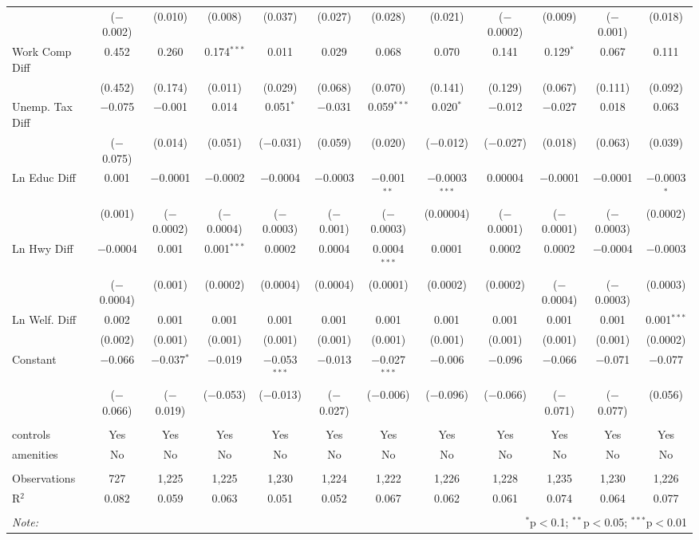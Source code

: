 \begin{table}[!htbp]
\begin{tabular}{@{\extracolsep{5pt}}lccccccccccc}
  & ($-$0.002) & (0.010) & (0.008) & (0.037) & (0.027) & (0.028) & (0.021) & ($-$0.0002) & (0.009) & ($-$0.001) & (0.018) \\ 
  Work Comp Diff & 0.452 & 0.260 & 0.174$^{***}$ & 0.011 & 0.029 & 0.068 & 0.070 & 0.141 & 0.129$^{*}$ & 0.067 & 0.111 \\ 
  & (0.452) & (0.174) & (0.011) & (0.029) & (0.068) & (0.070) & (0.141) & (0.129) & (0.067) & (0.111) & (0.092) \\ 
  Unemp. Tax Diff & $-$0.075 & $-$0.001 & 0.014 & 0.051$^{*}$ & $-$0.031 & 0.059$^{***}$ & 0.020$^{*}$ & $-$0.012 & $-$0.027 & 0.018 & 0.063 \\ 
  & ($-$0.075) & (0.014) & (0.051) & ($-$0.031) & (0.059) & (0.020) & ($-$0.012) & ($-$0.027) & (0.018) & (0.063) & (0.039) \\ 
  Ln Educ Diff & 0.001 & $-$0.0001 & $-$0.0002 & $-$0.0004 & $-$0.0003 & $-$0.001$^{**}$ & $-$0.0003$^{***}$ & 0.00004 & $-$0.0001 & $-$0.0001 & $-$0.0003$^{*}$ \\ 
  & (0.001) & ($-$0.0002) & ($-$0.0004) & ($-$0.0003) & ($-$0.001) & ($-$0.0003) & (0.00004) & ($-$0.0001) & ($-$0.0001) & ($-$0.0003) & (0.0002) \\ 
  Ln Hwy Diff & $-$0.0004 & 0.001 & 0.001$^{***}$ & 0.0002 & 0.0004 & 0.0004$^{***}$ & 0.0001 & 0.0002 & 0.0002 & $-$0.0004 & $-$0.0003 \\ 
  & ($-$0.0004) & (0.001) & (0.0002) & (0.0004) & (0.0004) & (0.0001) & (0.0002) & (0.0002) & ($-$0.0004) & ($-$0.0003) & (0.0003) \\ 
  Ln Welf. Diff & 0.002 & 0.001 & 0.001 & 0.001 & 0.001 & 0.001 & 0.001 & 0.001 & 0.001 & 0.001 & 0.001$^{***}$ \\ 
  & (0.002) & (0.001) & (0.001) & (0.001) & (0.001) & (0.001) & (0.001) & (0.001) & (0.001) & (0.001) & (0.0002) \\ 
  Constant & $-$0.066 & $-$0.037$^{*}$ & $-$0.019 & $-$0.053$^{***}$ & $-$0.013 & $-$0.027$^{***}$ & $-$0.006 & $-$0.096 & $-$0.066 & $-$0.071 & $-$0.077 \\ 
  & ($-$0.066) & ($-$0.019) & ($-$0.053) & ($-$0.013) & ($-$0.027) & ($-$0.006) & ($-$0.096) & ($-$0.066) & ($-$0.071) & ($-$0.077) & (0.056) \\ 
 \hline \\[-1.8ex] 
controls & Yes & Yes & Yes & Yes & Yes & Yes & Yes & Yes & Yes & Yes & Yes \\ 
amenities & No & No & No & No & No & No & No & No & No & No & No \\ 
\hline \\[-1.8ex] 
Observations & 727 & 1,225 & 1,225 & 1,230 & 1,224 & 1,222 & 1,226 & 1,228 & 1,235 & 1,230 & 1,226 \\ 
R$^{2}$ & 0.082 & 0.059 & 0.063 & 0.051 & 0.052 & 0.067 & 0.062 & 0.061 & 0.074 & 0.064 & 0.077 \\ 
\hline 
\hline \\[-1.8ex] 
\textit{Note:}  & \multicolumn{11}{r}{$^{*}$p$<$0.1; $^{**}$p$<$0.05; $^{***}$p$<$0.01} \\ 
\end{tabular} 
\end{table} 
